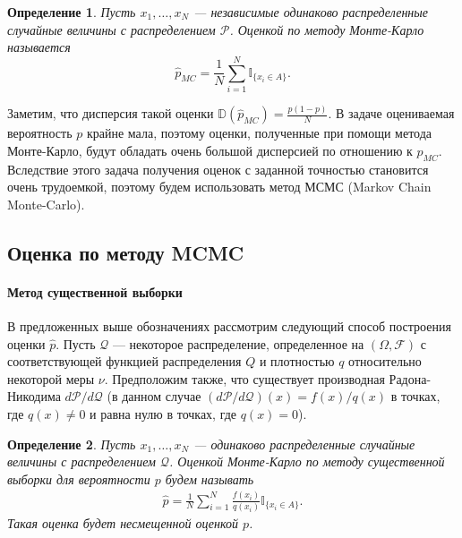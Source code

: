 \documentclass{spisok-article}
\newtheorem{dfn}{Определение}
\begin{document}
\begin{dfn}
Пусть $x_1, \ldots, x_N$ --- независимые одинаково распределенные случайные величины с распределением $\mathcal{P}$. Оценкой по методу Монте-Карло называется
\begin{equation*}
\widehat{p}_{MC} =
\frac{1}{N} \sum\limits_{i = 1}^N \mathbb{I}_{\{x_i \in A\}}.
\end{equation*}
\end{dfn}

Заметим, что дисперсия такой оценки $\mathbb{D}(\widehat{p}_{MC}) = \frac{p(1 - p)}{N}$. 
В задаче оцениваемая вероятность $p$ крайне мала, поэтому оценки, полученные при помощи метода Монте-Карло, будут обладать очень большой дисперсией по отношению к $p_{MC}$. Вследствие этого задача получения оценок с заданной точностью становится очень трудоемкой, поэтому будем использовать метод МСМС (Markov Chain Monte-Carlo).

\subsection{Оценка по методу MCMC}
\paragraph{Метод существенной выборки}
В предложенных выше обозначениях рассмотрим следующий способ построения оценки $\widehat{p}$. Пусть $\mathcal{Q}$ --- некоторое распределение, определенное на $(\Omega, \mathcal{F})$ с соответствующей функцией распределения $Q$ и плотностью $q$ относительно некоторой меры $\nu$.
 Предположим также, что существует производная Радона-Никодима $d\mathcal{P} / d\mathcal{Q}$ (в данном случае  $ (d\mathcal{P} / d\mathcal{Q})(x) = f(x)/q(x)$ в точках, где $q(x) \ne 0$ и равна нулю в точках, где $q(x) = 0$). 

\begin{dfn}
Пусть $x_1, \ldots, x_N$ ---  одинаково распределенные случайные величины с распределением $\mathcal{Q}$.
Оценкой Монте-Карло по методу существенной выборки для вероятности $p$ будем называть
\begin{gather*}
\widehat{p} = \frac{1}{N}\sum\limits_{i = 1}^N \frac{f(x_i)}{q(x_i)} \mathbb{I}_{\{x_i \in A\}}.
\end{gather*}
Такая оценка будет несмещенной оценкой $p$.
\end{dfn} 
\end{document}
